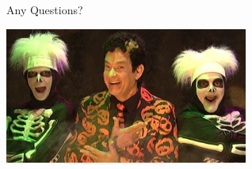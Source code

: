 \documentclass{beamer}
\begin{document}
\begin{frame}{Any Questions?}{}

  \includegraphics[width=0.6\textwidth, angle=0]{pumpkins.jpeg}
\end{frame}
\end{document}
